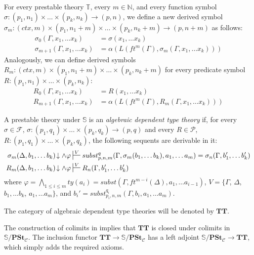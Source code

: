 \documentclass[reqno]{amsart}
\theoremstyle{definition}
\theoremstyle{remark}
\newcommand{\cat}[1]{\mathbf{#1}}
\newcommand{\algtt}{\cat{TT}}
\newcommand{\substTh}{\mathbb{S}}
\newcommand{\PSt}{\cat{PSt}}
\numberwithin{figure}{section}
\begin{document}
For every prestable theory $\mathbb{T}$, every $m \in \mathbb{N}$, and every function symbol $\sigma : (p_1,n_1) \times \ldots \times (p_k,n_k) \to (p,n)$,
we define a new derived symbol $\sigma_m : (ctx,m) \times (p_1,n_1+m) \times \ldots \times (p_k,n_k+m) \to (p,n+m)$ as follows:
\begin{align*}
\sigma_0(\Gamma, x_1, \ldots x_k) & = \sigma(x_1, \ldots x_k) \\
\sigma_{m+1}(\Gamma, x_1, \ldots x_k) & = \alpha(L(ft^m(\Gamma), \sigma_m(\Gamma, x_1, \ldots x_k)))
\end{align*}
Analogously, we can define derived symbols $R_m : (ctx,m) \times (p_1,n_1+m) \times \ldots \times (p_k,n_k+m)$ for every predicate symbol $R : (p_1,n_1) \times \ldots \times (p_k,n_k)$:
\begin{align*}
R_0(\Gamma, x_1, \ldots x_k) & = R(x_1, \ldots x_k) \\
R_{m+1}(\Gamma, x_1, \ldots x_k) & = \alpha(L(ft^m(\Gamma), R_m(\Gamma, x_1, \ldots x_k)))
\end{align*}

\begin{defn}
A prestable theory under $\substTh$ is an \emph{algebraic dependent type theory} if,
for every $\sigma \in \mathcal{F}$, $\sigma : (p_1,q_1) \times \ldots \times (p_k,q_k) \to (p,q)$
and every $R \in \mathcal{P}$, $R : (p_1,q_1) \times \ldots \times (p_k,q_k)$, the following sequents are derivable in it:
\begin{align*}
\sigma_m(\Delta, b_1, \ldots b_k)\!\downarrow \land \varphi & \sststile{}{V} subst^q_{p,n,m}(\Gamma, \sigma_m(b_1, \ldots b_k), a_1, \ldots a_m) = \sigma_n(\Gamma, b_1', \ldots b_k') \\
R_m(\Delta, b_1, \ldots b_k)\!\downarrow \land \varphi & \sststile{}{V} R_n(\Gamma, b_1', \ldots b_k')
\end{align*}
where $\varphi = \bigwedge_{1 \leq i \leq m} ty(a_i) = subst(\Gamma, ft^{m-i}(\Delta), a_1, \ldots a_{i-1})$, $V = \{ \Gamma$, $\Delta$, $b_1, \ldots b_k$, $a_1, \ldots a_m \}$,
and $b_i' = subst^{q_i}_{p_i,n,m}(\Gamma, b_i, a_1, \ldots a_m)$.

The category of algebraic dependent type theories will be denoted by $\algtt$.
\end{defn}

The construction of colimits in  implies that $\algtt$ is closed under colimits in $\substTh/\PSt_\mathcal{C}$.
The inclusion functor $\algtt \to \substTh/\PSt_\mathcal{C}$ has a left adjoint $\substTh/\PSt_\mathcal{C} \to \algtt$, which simply adds the required axioms.
\end{document}
